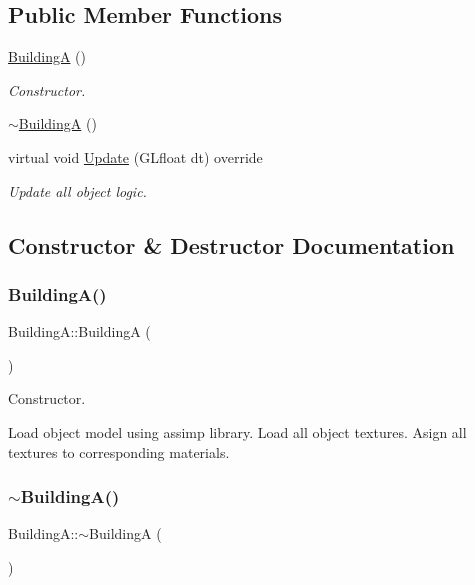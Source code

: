 \subsection*{Public Member Functions}
\begin{DoxyCompactItemize}
\item 
\mbox{\hyperlink{class_building_a_aaa98f1df02c8d9748b682be534d27ea3}{BuildingA}} ()
\begin{DoxyCompactList}\small\item\em Constructor. \end{DoxyCompactList}\item 
\mbox{\hyperlink{class_building_a_ad5864e3403b52b35d832afae91b21969}{$\sim$\+BuildingA}} ()
\item 
virtual void \mbox{\hyperlink{class_building_a_a2d9a674fe2fcdd7aedaae67b5c77865a}{Update}} (G\+Lfloat dt) override
\begin{DoxyCompactList}\small\item\em Update all object logic. \end{DoxyCompactList}\end{DoxyCompactItemize}


\subsection{Constructor \& Destructor Documentation}
\mbox{\label{class_building_a_aaa98f1df02c8d9748b682be534d27ea3}} 
\subsubsection{\texorpdfstring{BuildingA()}{BuildingA()}}
{\footnotesize\ttfamily Building\+A\+::\+BuildingA (\begin{DoxyParamCaption}{ }\end{DoxyParamCaption})}



Constructor. 

Load object model using assimp library. Load all object textures. Asign all textures to corresponding materials. \mbox{\label{class_building_a_ad5864e3403b52b35d832afae91b21969}} 
\subsubsection{\texorpdfstring{$\sim$BuildingA()}{~BuildingA()}}
{\footnotesize\ttfamily Building\+A\+::$\sim$\+BuildingA (\begin{DoxyParamCaption}{ }\end{DoxyParamCaption})}



